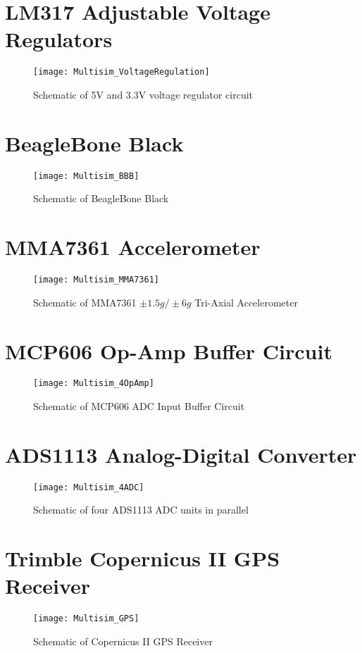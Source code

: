 \section{LM317 Adjustable Voltage Regulators}
\begin{figure}[H]
\centering
\texttt{[image: Multisim\_VoltageRegulation]}
\caption{Schematic of 5V and 3.3V voltage regulator circuit}
\label{fig:Schematic_VoltageReg}
\end{figure}

\section{BeagleBone Black}
\begin{figure}[H]
\centering
\texttt{[image: Multisim\_BBB]}
\caption{Schematic of BeagleBone Black}
\label{fig:Schematic_BBB}
\end{figure}

\section{MMA7361 Accelerometer}
\begin{figure}[H]
\centering
\texttt{[image: Multisim\_MMA7361]}
\caption{Schematic of MMA7361 $\pm 1.5g/ \pm 6g$ Tri-Axial Accelerometer}
\label{fig:Schematic_MMA7361}
\end{figure}

\section{MCP606 Op-Amp Buffer Circuit}
\begin{figure}[H]
\centering
\texttt{[image: Multisim\_4OpAmp]}
\caption{Schematic of MCP606 ADC Input Buffer Circuit}
\label{fig:Schematic_MCP606}
\end{figure}

\section{ADS1113 Analog-Digital Converter}
\begin{figure}[H]
\centering
\texttt{[image: Multisim\_4ADC]}
\caption{Schematic of four ADS1113 ADC units in parallel}
\label{fig:Schematic_ADS1113}
\end{figure}

\section{Trimble Copernicus II GPS Receiver}
\begin{figure}[H]
\centering
\texttt{[image: Multisim\_GPS]}
\caption{Schematic of Copernicus II GPS Receiver}
\label{fig:Schematic_Copernicus}
\end{figure}